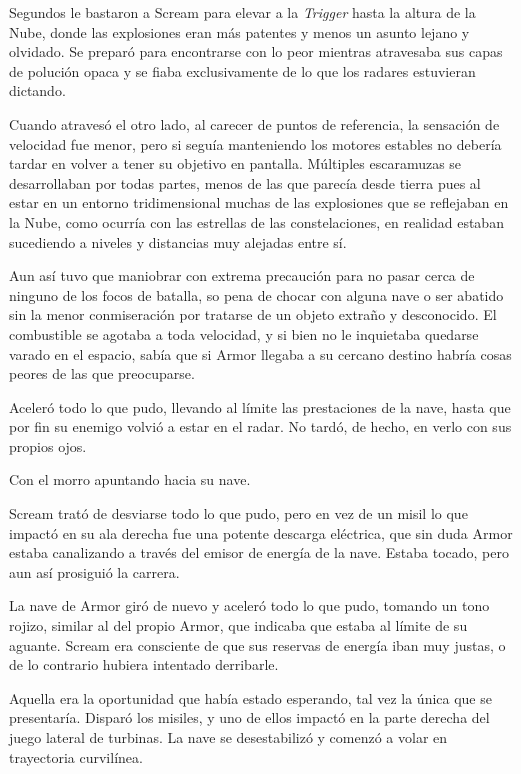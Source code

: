 Segundos le bastaron a Scream para elevar a la \emph{Trigger} hasta la altura de la Nube, donde las explosiones eran más patentes y menos un asunto lejano y olvidado. Se preparó para encontrarse con lo peor mientras atravesaba sus capas de polución opaca y se fiaba exclusivamente de lo que los radares estuvieran dictando.

Cuando atravesó el otro lado, al carecer de puntos de referencia, la sensación de velocidad fue menor, pero si seguía manteniendo los motores estables no debería tardar en volver a tener su objetivo en pantalla. Múltiples escaramuzas se desarrollaban por todas partes, menos de las que parecía desde tierra pues al estar en un entorno tridimensional muchas de las explosiones que se reflejaban en la Nube, como ocurría con las estrellas de las constelaciones, en realidad estaban sucediendo a niveles y distancias muy alejadas entre sí.

Aun así tuvo que maniobrar con extrema precaución para no pasar cerca de ninguno de los focos de batalla, so pena de chocar con alguna nave o ser abatido sin la menor conmiseración por tratarse de un objeto extraño y desconocido. El combustible se agotaba a toda velocidad, y si bien no le inquietaba quedarse varado en el espacio, sabía que si Armor llegaba a su cercano destino habría cosas peores de las que preocuparse.

Aceleró todo lo que pudo, llevando al límite las prestaciones de la nave, hasta que por fin su enemigo volvió a estar en el radar. No tardó, de hecho, en verlo con sus propios ojos.

Con el morro apuntando hacia su nave.

Scream trató de desviarse todo lo que pudo, pero en vez de un misil lo que impactó en su ala derecha fue una potente descarga eléctrica, que sin duda Armor estaba canalizando a través del emisor de energía de la nave. Estaba tocado, pero aun así prosiguió la carrera.

La nave de Armor giró de nuevo y aceleró todo lo que pudo, tomando un tono rojizo, similar al del propio Armor, que indicaba que estaba al límite de su aguante. Scream era consciente de que sus reservas de energía iban muy justas, o de lo contrario hubiera intentado derribarle.

Aquella era la oportunidad que había estado esperando, tal vez la única que se presentaría. Disparó los misiles, y uno de ellos impactó en la parte derecha del juego lateral de turbinas. La nave se desestabilizó y comenzó a volar en trayectoria curvilínea.

